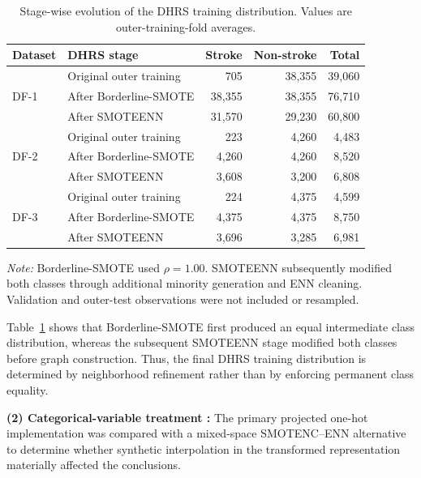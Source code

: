 \documentclass[pdflatex,sn-mathphys-num]{sn-jnl}%
\theoremstyle{thmstyleone}%
\theoremstyle{thmstyletwo}%
\theoremstyle{thmstylethree}%
\begin{document}
\begin{table}[!ht]
\centering
\caption{
Stage-wise evolution of the DHRS training distribution. Values are
outer-training-fold averages.
}
\label{tab:dhrs_stage_distribution}
\small
\setlength{\tabcolsep}{5pt}
\renewcommand{\arraystretch}{1.07}
\begin{tabular}{@{}llrrr@{}}
\toprule
\textbf{Dataset} &
\textbf{DHRS stage} &
\textbf{Stroke} &
\textbf{Non-stroke} &
\textbf{Total} \\
\midrule
\multirow{3}{*}{DF-1}
& Original outer training & 705 & 38,355 & 39,060 \\
& After Borderline-SMOTE & 38,355 & 38,355 & 76,710 \\
& After SMOTEENN & 31,570 & 29,230 & 60,800 \\
\midrule
\multirow{3}{*}{DF-2}
& Original outer training & 223 & 4,260 & 4,483 \\
& After Borderline-SMOTE & 4,260 & 4,260 & 8,520 \\
& After SMOTEENN & 3,608 & 3,200 & 6,808 \\
\midrule
\multirow{3}{*}{DF-3}
& Original outer training & 224 & 4,375 & 4,599 \\
& After Borderline-SMOTE & 4,375 & 4,375 & 8,750 \\
& After SMOTEENN & 3,696 & 3,285 & 6,981 \\
\bottomrule
\end{tabular}

\vspace{2pt}
\begin{minipage}{0.97\textwidth}
\footnotesize
\textit{Note:} Borderline-SMOTE used \(\rho=1.00\). SMOTEENN subsequently
modified both classes through additional minority generation and ENN
cleaning. Validation and outer-test observations were not included or
resampled.
\end{minipage}
\end{table}
\endgroup

 {
Table~\ref{tab:dhrs_stage_distribution} shows that Borderline-SMOTE first
produced an equal intermediate class distribution, whereas the subsequent
SMOTEENN stage modified both classes before graph construction. Thus, the
final DHRS training distribution is determined by neighborhood refinement
rather than by enforcing permanent class equality.
}

\textbf{(2) Categorical-variable treatment :}  {
The primary projected one-hot implementation was compared with a mixed-space
SMOTENC--ENN alternative to determine whether synthetic interpolation in the
transformed representation materially affected the conclusions.
}
\end{document}
